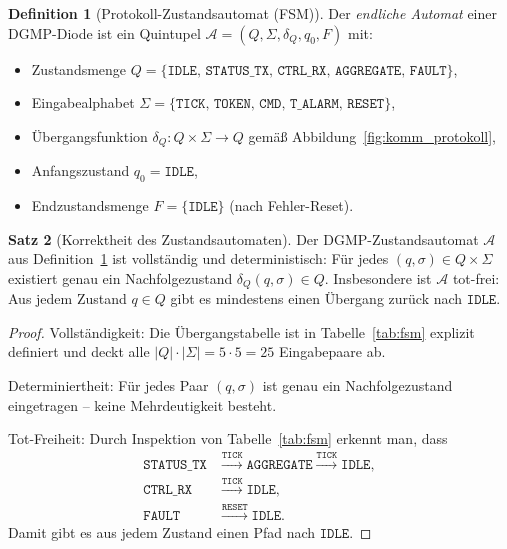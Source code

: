 ﻿\documentclass[a4paper,12pt]{article}
\theoremstyle{definition}
\newtheorem{definition}{Definition}[section]
\newtheorem{satz}[definition]{Satz}
\theoremstyle{remark}
\begin{document}
\begin{definition}[Protokoll-Zustandsautomat (FSM)]
\label{def:fsm}
Der \emph{endliche Automat} einer DGMP-Diode ist ein Quintupel
$\mathcal{A} = (Q, \Sigma, \delta_Q, q_0, F)$ mit:
\begin{itemize}
  \item Zustandsmenge $Q = \{\mathtt{IDLE},\, \mathtt{STATUS\_TX},\,
    \mathtt{CTRL\_RX},\, \mathtt{AGGREGATE},\, \mathtt{FAULT}\}$,
  \item Eingabealphabet $\Sigma = \{\mathtt{TICK},\, \mathtt{TOKEN},\,
    \mathtt{CMD},\, \mathtt{T\_ALARM},\, \mathtt{RESET}\}$,
  \item Übergangsfunktion $\delta_Q: Q \times \Sigma \to Q$ gemäß
    Abbildung~\ref{fig:komm_protokoll},
  \item Anfangszustand $q_0 = \mathtt{IDLE}$,
  \item Endzustandsmenge $F = \{\mathtt{IDLE}\}$ (nach Fehler-Reset).
\end{itemize}
\end{definition}

\begin{satz}[Korrektheit des Zustandsautomaten]
\label{satz:fsm_korrektheit}
Der DGMP-Zustandsautomat $\mathcal{A}$ aus Definition~\ref{def:fsm}
ist vollständig und deterministisch: Für jedes $(q, \sigma) \in Q \times \Sigma$
existiert genau ein Nachfolgezustand $\delta_Q(q, \sigma) \in Q$.
Insbesondere ist $\mathcal{A}$ tot-frei: Aus jedem Zustand $q \in Q$ gibt
es mindestens einen Übergang zurück nach $\mathtt{IDLE}$.
\end{satz}

\begin{proof}
Vollständigkeit: Die Übergangstabelle ist in Tabelle~\ref{tab:fsm} explizit
definiert und deckt alle $|Q| \cdot |\Sigma| = 5 \cdot 5 = 25$ Eingabepaare ab.

Determiniertheit: Für jedes Paar $(q, \sigma)$ ist genau ein Nachfolgezustand
eingetragen -- keine Mehrdeutigkeit besteht.

Tot-Freiheit: Durch Inspektion von Tabelle~\ref{tab:fsm} erkennt man, dass
\begin{align*}
  \mathtt{STATUS\_TX} &\xrightarrow{\mathtt{TICK}} \mathtt{AGGREGATE}
                       \xrightarrow{\mathtt{TICK}} \mathtt{IDLE}, \\
  \mathtt{CTRL\_RX}   &\xrightarrow{\mathtt{TICK}} \mathtt{IDLE}, \\
  \mathtt{FAULT}      &\xrightarrow{\mathtt{RESET}} \mathtt{IDLE}.
\end{align*}
Damit gibt es aus jedem Zustand einen Pfad nach $\mathtt{IDLE}$. \qedhere
\end{proof}
\end{document}
